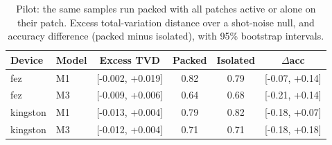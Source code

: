 \begin{table}[t]
\centering
\caption{Pilot: the same samples run packed with all patches active or alone on their patch. Excess total-variation distance over a shot-noise null, and accuracy difference (packed minus isolated), with 95\% bootstrap intervals.}
\label{tab:pilot}
\footnotesize
\setlength{\tabcolsep}{3.5pt}
\begin{tabular}{llcccc}
\toprule
Device & Model & Excess TVD & Packed & Isolated & $\Delta$acc \\
\midrule
fez & M1 & [-0.002, +0.019] & 0.82 & 0.79 & [-0.07, +0.14] \\
fez & M3 & [-0.009, +0.006] & 0.64 & 0.68 & [-0.21, +0.14] \\
kingston & M1 & [-0.013, +0.004] & 0.79 & 0.82 & [-0.18, +0.07] \\
kingston & M3 & [-0.012, +0.004] & 0.71 & 0.71 & [-0.18, +0.18] \\
\bottomrule
\end{tabular}
\end{table}
